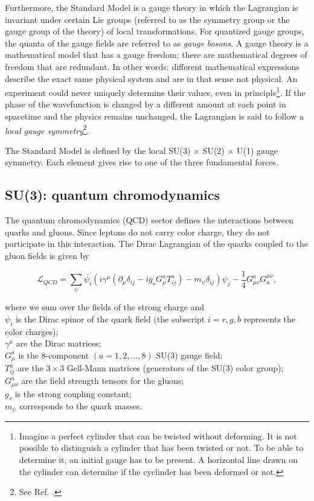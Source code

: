 Furthermore, the Standard Model is a gauge theory in which the Lagrangian is invariant under certain Lie groups (referred to as the symmetry group or the gauge group of the theory) of local transformations. For quantized gauge groups, the quanta of the gauge fields are referred to as \textit{gauge bosons}. A gauge theory is a mathematical model that has a gauge freedom; there are mathematical degrees of freedom that are redundant. In other words: different mathematical expressions describe the exact same physical system and are in that sense not physical. An experiment could never uniquely determine their values, even in principle\footnote{Imagine a perfect cylinder that can be twisted without deforming. It is not possible to distinguish a cylinder that has been twisted or not. To be able to determine it, an initial gauge has to be present. A horizontal line drawn on the cylinder can determine if the cyclinder has been deformed or not.}. If the phase of the wavefunction is changed by a different amount at each point in spacetime and the physics remains unchanged, the Lagrangian is said to follow a \textit{local gauge symmetry}\footnote{See Ref. \cite{mandl2013quantum}.}.

The Standard Model is defined by the local SU(3) $\times$ SU(2) $\times$ U(1) gauge symmetry. Each element gives rise to one of the three fundamental forces.
\subsection{SU(3): quantum chromodynamics}
\label{subsec:QCD}
The quantum chromodynamics (QCD) sector defines the interactions between quarks and gluons. Since leptons do not carry color charge, they do not participate in this interaction. The Dirac Lagrangian of the quarks coupled to the gluon fields is given by


\begin{equation}
\mathcal{L}_{QCD} = \sum_{\psi} \bar{\psi_i} \left(i \gamma^\mu \left(\partial_\mu  \delta_{ij} - i g_s G^a_{\mu} T^a_{ij}\right) - m_\psi \delta_{ij} \right) \psi_j - \frac{1}{4} G^a_{\mu\nu}G^{\mu\nu}_a,
\end{equation}

where we sum over the fields of the strong charge and\\
\indent $\psi_i$ is the Dirac spinor of the quark field (the subscript $i={r,g,b}$ represents the color charges);\\
\indent $\gamma^\mu$ are the Dirac matrices;\\
\indent $G^a_\mu$ is the 8-component $\left(a=1,2,...,8\right)$ SU(3) gauge field;\\
\indent $T^a_{ij}$ are the $3\times3$ Gell-Mann matrices (generators of the SU(3) color group);\\
\indent $G^a_{\mu\nu}$ are the field strength tensors for the gluons;\\
\indent $g_s$ is the strong coupling constant;\\
\indent $m_\psi$ corresponds to the quark masses.

